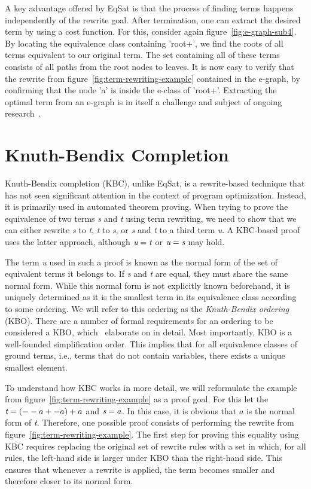 A key advantage offered by EqSat is that the process of finding terms happens independently of the rewrite goal. After termination, one can extract the desired term by using a cost function. For this, consider again figure~\ref{fig:e-graph-sub4}. By locating the equivalence class containing 'root+', we find the roots of all terms equivalent to our original term. The set containing all of these terms consists of all paths from the root nodes to leaves. It is now easy to verify that the rewrite from figure~\ref{fig:term-rewriting-example} contained in the e-graph, by confirming that the node 'a' is inside the e-class of 'root+'. Extracting the optimal term from an e-graph is in itself a challenge and subject of ongoing research~\citep{10.1145/3669940.3707262}.

\section{Knuth-Bendix Completion}
\label{sec:knuth-bendix-completion}

Knuth-Bendix completion (KBC), unlike EqSat, is a rewrite-based technique that has not seen significant attention in the context of program optimization. Instead, it is primarily used in automated theorem proving. When trying to prove the equivalence of two terms \emph{s} and \emph{t} using term rewriting, we need to show that we can either rewrite \emph{s} to \emph{t}, \emph{t} to \emph{s}, or \emph{s} and \emph{t} to a third term \emph{u}. A KBC-based proof uses the latter approach, although $\emph{u} = \emph{t}$ or $\emph{u} = \emph{s}$ may hold.

The term \emph{u} used in such a proof is known as the normal form of the set of equivalent terms it belongs to. If \emph{s} and \emph{t} are equal, they must share the same normal form. While this normal form is not explicitly known beforehand, it is uniquely determined as it is the smallest term in its equivalence class according to some ordering. We will refer to this ordering as the \emph{Knuth-Bendix ordering} (KBO). There are a number of formal requirements for an ordering to be considered a KBO, which~\cite{BaaderNipkow1998} elaborate on in detail. Most importantly, KBO is a well-founded simplification order. This implies that for all equivalence classes of ground terms, i.e., terms that do not contain variables, there exists a unique smallest element. 

To understand how KBC works in more detail, we will reformulate the example from figure~\ref{fig:term-rewriting-example} as a proof goal. For this let the $\emph{t} = (--a + -a) + a$ and $\emph{s} = a$. In this case, it is obvious that $a$ is the normal form of \emph{t}. Therefore, one possible proof consists of performing the rewrite from figure~\ref{fig:term-rewriting-example}. The first step for proving this equality using KBC requires replacing the original set of rewrite rules with a set in which, for all rules, the left-hand side is larger under KBO than the right-hand side. This ensures that whenever a rewrite is applied, the term becomes smaller and therefore closer to its normal form.

